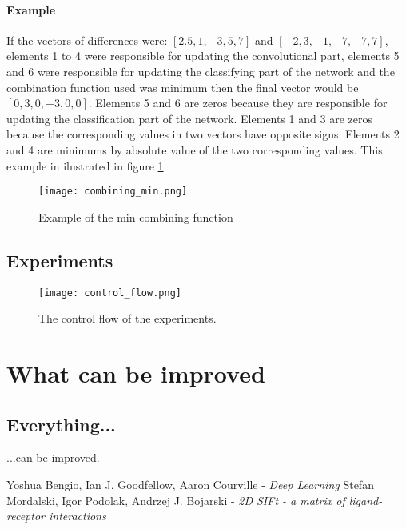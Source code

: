 \documentclass[a4paper,10pt]{report}
\begin{document}
      \subsubsection{Example}
      If the vectors of differences were: $[2.5, 1, -3, 5, 7]$ and $[-2, 3, -1, -7, -7, 7]$, elements 1 to 4 were responsible for updating the convolutional part, elements 5 and 6 were responsible for updating the classifying part of the network and the combination function used was minimum then the final vector would be $[0, 3, 0, -3, 0, 0]$. Elements 5 and 6 are zeros because they are responsible for updating the classification part of the network. Elements 1 and 3 are zeros because the corresponding values in two vectors have opposite signs. Elements 2 and 4 are minimums by absolute value of the two corresponding values. This example in ilustrated in figure \ref{fig:combining}.\\
      
      \begin{figure}[h!]
	  \centering
	  \texttt{[image: combining\_min.png]}
	  \caption{Example of the min combining function}
	  \label{fig:combining}	%
	\end{figure} 
      
      \section{Experiments}
      
      \begin{figure}[h!]
	  \centering
	  \texttt{[image: control\_flow.png]}
	  \caption{The control flow of the experiments.}
	  \label{fig:control_flow}	%
	\end{figure} 
	
  \chapter{What can be improved} %
    \section{Everything...}
      ...can be improved.\\

  \begin{thebibliography}{99}
      Yoshua Bengio, Ian J. Goodfellow, Aaron Courville - \emph{Deep Learning}
      Stefan Mordalski, Igor Podolak, Andrzej J. Bojarski - \emph{2D SIFt - a matrix of ligand-receptor interactions}
    
  \end{thebibliography}
  
\end{document}
